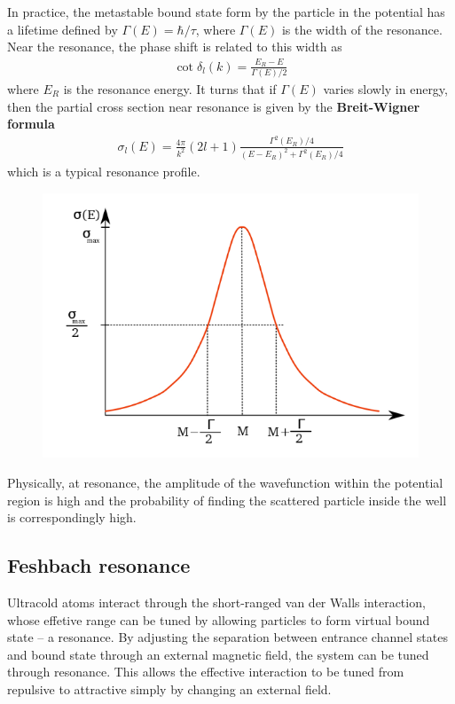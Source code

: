 \documentclass{book}
\theoremstyle{definition}
\newcommand{\f}[2]{\frac{#1}{#2}}
\begin{document}
In practice, the metastable bound state form by the particle in the potential has a lifetime defined by $\Gamma(E) = \hbar /\tau$, where $\Gamma(E)$ is the width of the resonance. Near the resonance, the phase shift is related to this width as 
\begin{align*}
	\cot \delta_l(k) = \f{E_R - E}{\Gamma(E)/2}
\end{align*}
where $E_R$ is the resonance energy. It turns that if $\Gamma(E)$ varies slowly in energy, then the partial cross section near resonance is given by the \textbf{Breit-Wigner formula}
\begin{align*}
	\sigma_l(E) = \f{4\pi}{k^2}(2l+1) \f{\Gamma^2(E_R)/4}{(E-E_R)^2 + \Gamma^2(E_R)/4}
\end{align*}
which is a typical resonance profile.

\begin{figure}[!htb]
	\centering
	\includegraphics[scale=0.5]{figures/resonance.png}
\end{figure}

\begin{framed}
	Physically, at resonance, the amplitude of the wavefunction within the potential region is high and the probability of finding the scattered particle inside the well is correspondingly high.
\end{framed}


\subsection{Feshbach resonance}

Ultracold atoms interact through the short-ranged van der Walls interaction, whose effetive range can be tuned by allowing particles to form virtual bound state -- a resonance. By adjusting the separation between entrance channel states and bound state through an external magnetic field, the system can be tuned through resonance. This allows the effective interaction to be tuned from repulsive to attractive simply by changing an external field. \\
\end{document}
